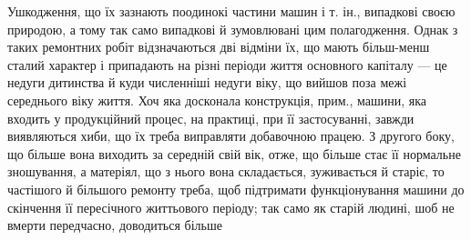 Ушкодження, що їх зазнають поодинокі частини машин і т. ін., випадкові своєю природою, а тому так
само випадкові й зумовлювані цим полагодження. Однак з таких ремонтних робіт відзначаються дві
відміни їх, що мають більш-менш сталий характер і припадають на різні періоди життя основного
капіталу — це недуги дитинства й куди численніші недуги віку, що вийшов поза межі середнього віку
життя. Хоч яка досконала конструкція, прим., машини, яка входить у продукційний процес, на практиці,
при її застосуванні, завжди виявляються хиби, що їх треба виправляти добавочною працею. З другого
боку, що більше вона виходить за середній свій вік, отже, що більше стає її нормальне зношування, а
матеріял, що з нього вона складається, зуживається й старіє, то частішого й більшого ремонту треба,
щоб підтримати функціонування машини до скінчення її пересічного життьового періоду; так само як
старій людині, шоб не вмерти передчасно, доводиться більше
\parbreak{}  %
